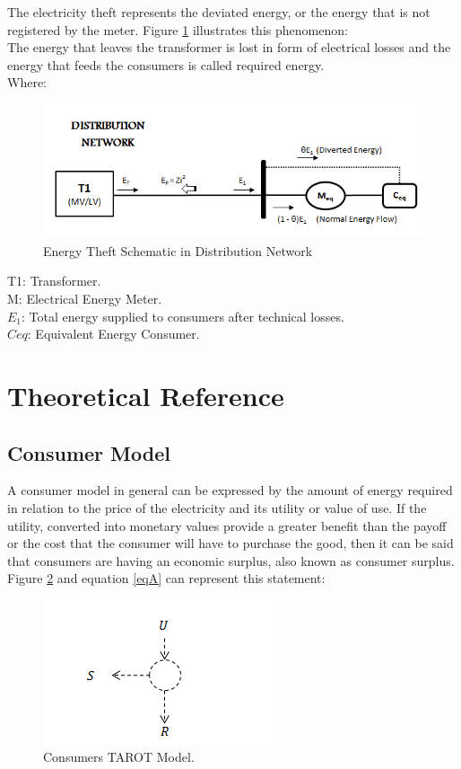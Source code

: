 \documentclass[10pt, letterpaper]{elsarticle}
\begin{document}
The electricity theft represents the deviated energy, or the energy that is not registered by the meter. Figure \ref{Fig2} illustrates this phenomenon:\\
The energy that leaves the transformer is lost in form of electrical losses and the energy that feeds the consumers is called required energy.\\
Where:\\

\begin{figure}[h]
\centering\includegraphics[width=0.8\linewidth]{Fig2.png}
\caption{Energy Theft Schematic in Distribution Network}
\label{Fig2}
\end{figure}

T1: Transformer.\\
M: Electrical Energy Meter.\\
$E_1$: Total energy supplied to consumers after technical losses.\\
$Ceq$: Equivalent Energy Consumer.\\

\section{Theoretical Reference}
\label{S:2}

\subsection{Consumer Model}
\label{SS:2-1}

A consumer model in general can be expressed by the amount of energy required in relation to the price of the electricity and its utility or value of use. If the utility, converted into monetary values provide a greater benefit than the payoff or the cost that the consumer will have to purchase the good, then it can be said that consumers are having an economic surplus, also known as consumer surplus. Figure \ref{Fig3} and equation \ref{eqA} can represent this statement:

\begin{figure}[h]%
\centering
\includegraphics[scale=1]{Fig3.png} 
\caption{Consumers TAROT Model.}
\label{Fig3}
\end{figure}
\end{document}
